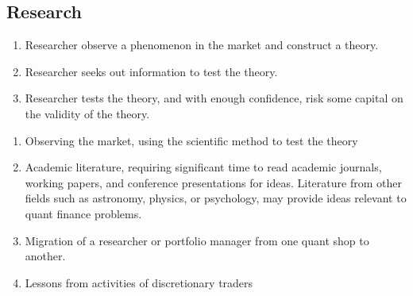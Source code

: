 \subsection{Research}

\begin{definition} 
\begin{enumerate}[label=\arabic*.]
\setlength{\itemsep}{0pt}
\item Researcher observe a phenomenon in the market and construct a theory.
\item Researcher seeks out information to test the theory.
\item Researcher tests the theory, and with enough confidence, risk some capital on the validity of the theory.
\end{enumerate}
\end{definition}

\begin{remark} 
\begin{enumerate}[label=\arabic*.]
\setlength{\itemsep}{0pt}
\item Observing the market, using the scientific method to test the theory
\item Academic literature, requiring significant time to read academic journals, working papers, and conference presentations for ideas. Literature from other fields such as astronomy, physics, or psychology, may provide ideas relevant to quant finance problems.
\item Migration of a researcher or portfolio manager from one quant shop to another.
\item Lessons from activities of discretionary traders
\end{enumerate}
\end{remark}

